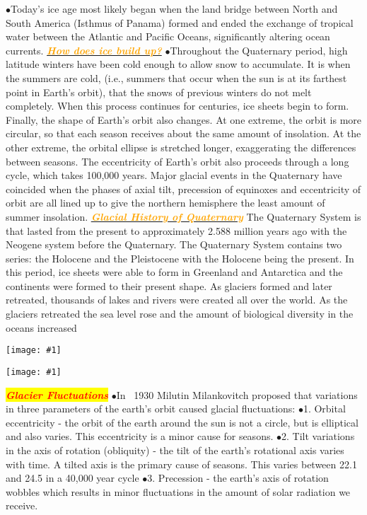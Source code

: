 \documentclass{article}
\newcommand{\ddd}{$\bullet$}
\newcommand{\red}[1]{\textcolor{red}{#1}}
\newcommand{\orange}[1]{\textcolor{orange}{#1}}
\newcommand{\mysection}[1]{\colorbox{yellow}{\textbf{\textit{\red{#1}}}}}
\newcommand{\mysub}[1]{\underline{\textbf{{\textit{\orange{#1}}}}}}
\newcommand{\fig}[1]{
	\texttt{[image: \#1]}
}
\begin{document}
\begin{multicols*}{4}
                \ddd Today’s ice age most likely began when the land bridge between North and South America (Isthmus of Panama) formed and ended the exchange of tropical water between the Atlantic and Pacific Oceans, significantly altering ocean currents.
            \mysub{How does ice build up?}
                \ddd Throughout the Quaternary period, high latitude winters have been cold enough to allow snow to accumulate. It is when the summers are cold, (i.e., summers that occur when the sun is at its farthest point in Earth's orbit), that the snows of previous winters do not melt completely. When this process continues for centuries, ice sheets begin to form. Finally, the shape of Earth's orbit also changes. At one extreme, the orbit is more circular, so that each season receives about the same amount of insolation. At the other extreme, the orbital ellipse is stretched longer, exaggerating the differences between seasons. The eccentricity of Earth's orbit also proceeds through a long cycle, which takes 100,000 years. Major glacial events in the Quaternary have coincided when the phases of axial tilt, precession of equinoxes and eccentricity of orbit are all lined up to give the northern hemisphere the least amount of summer insolation.
            \mysub{Glacial History of Quaternary}
                The Quaternary System is that lasted from the present to approximately 2.588 million years ago with the Neogene system before the Quaternary. The Quaternary System contains two series: the Holocene and the Pleistocene with the Holocene being the present. In this period, ice sheets were able to form in Greenland and Antarctica and the continents were formed to their present shape. As glaciers formed and later retreated, thousands of lakes and rivers were created all over the world. As the glaciers retreated the sea level rose and the amount of biological diversity in the oceans increased
                \fig{Quelccaya_Glacier}
                \fig{series}
     \mysection{Glacier Fluctuations}
	        \ddd In ~1930 Milutin Milankovitch proposed that variations in three parameters of the earth's orbit caused glacial fluctuations: 
	        \ddd 1.	Orbital eccentricity - the orbit of the earth around the sun is not a circle, but is elliptical and also varies. This eccentricity is a minor cause for seasons.
	        \ddd 2.	Tilt variations in the axis of rotation (obliquity) - the tilt of the earth's rotational axis varies with time. A tilted axis is the primary cause of seasons. This varies between 22.1 and 24.5 in a 40,000 year cycle
	        \ddd 3.	Precession - the earth's axis of rotation wobbles which results in minor fluctuations in the amount of solar radiation we receive.

\end{multicols*}
\end{document}
